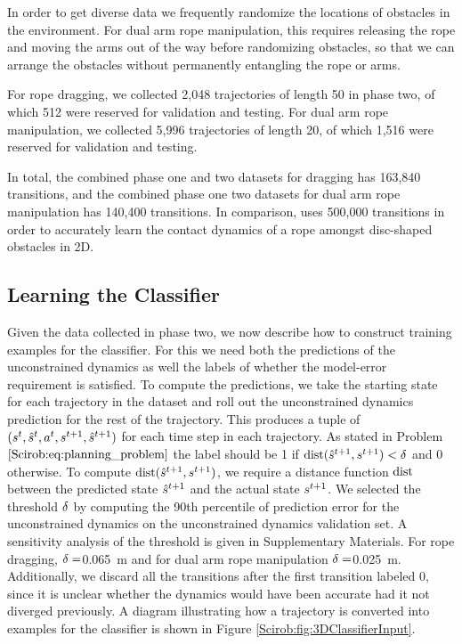 In order to get diverse data we frequently randomize the locations of obstacles in the environment. For dual arm rope manipulation, this requires releasing the rope and moving the arms out of the way before randomizing obstacles, so that we can arrange the obstacles without permanently entangling the rope or arms.

For rope dragging, we collected 2,048 trajectories of length 50 in phase two, of which 512 were reserved for validation and testing. For dual arm rope manipulation, we collected 5,996 trajectories of length 20, of which 1,516 were reserved for validation and testing.

In total, the combined phase one and two datasets for dragging has 163,840 transitions, and the combined phase one two datasets for dual arm rope manipulation has 140,400 transitions. In comparison, \cite{Propnet} uses 500,000 transitions in order to accurately learn the contact dynamics of a rope amongst disc-shaped obstacles in 2D.

\subsection{Learning the Classifier}
\label{Scirob:sec:learning_classifier}

Given the data collected in phase two, we now describe how to construct training examples for the classifier. For this we need both the predictions of the unconstrained dynamics as well the labels of whether the model-error requirement is satisfied. To compute the predictions, we take the starting state for each trajectory in the dataset and roll out the unconstrained dynamics prediction for the rest of the trajectory. This produces a tuple of $(s^{t}, \hat{s}^{t}, a^{t}, s^{t+1}, \hat{s}^{t+1})$ for each time step in each trajectory. As stated in Problem $\eqref{Scirob:eq:planning_problem}$ the label should be 1 if $\mathrm{dist}(\hat{s}^{t+1},s^{t+1}) < \delta$ and 0 otherwise. To compute $\mathrm{dist}(\hat{s}^{t+1},s^{t+1})$, we require a distance function $\mathrm{dist}$ between the predicted state $\hat{s}^{t+1}$ and the actual state $s^{t+1}$. We selected the threshold $\delta$ by computing the 90th percentile of prediction error for the unconstrained dynamics on the unconstrained dynamics validation set. A sensitivity analysis of the threshold is given in Supplementary Materials. For rope dragging, $\delta=$\SI{0.065}{\meter} and for dual arm rope manipulation $\delta=$\SI{0.025}{\meter}. Additionally, we discard all the transitions after the first transition labeled 0, since it is unclear whether the dynamics would have been accurate had it not diverged previously. A diagram illustrating how a trajectory is converted into examples for the classifier is shown in Figure \ref{Scirob:fig:3DClassifierInput}.

